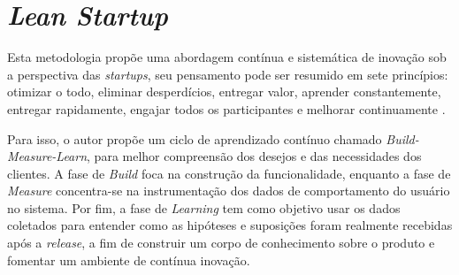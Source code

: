 \section{\textit{Lean Startup}}

Esta metodologia \cite{ries2011lean} propõe uma abordagem contínua e sistemática de inovação sob a perspectiva das \textit{startups}, seu pensamento pode ser resumido em sete princípios: otimizar o todo, eliminar desperdícios, entregar valor, aprender constantemente, entregar rapidamente, engajar todos os participantes e melhorar continuamente \cite{poppendieck2003lean}. 


Para isso, o autor propõe um ciclo de aprendizado contínuo chamado \textit{Build-Measure-Learn}, para melhor compreensão dos desejos e das necessidades dos clientes. A fase de \textit{Build} foca na construção da funcionalidade, enquanto a fase de \textit{Measure} concentra-se na instrumentação dos dados de comportamento do usuário no sistema. Por fim, a fase de \textit{Learning} tem como objetivo usar os dados coletados para entender como as hipóteses e suposições foram realmente recebidas após a \textit{release}, a fim de construir um corpo de conhecimento sobre o produto e fomentar um ambiente de contínua inovação.
